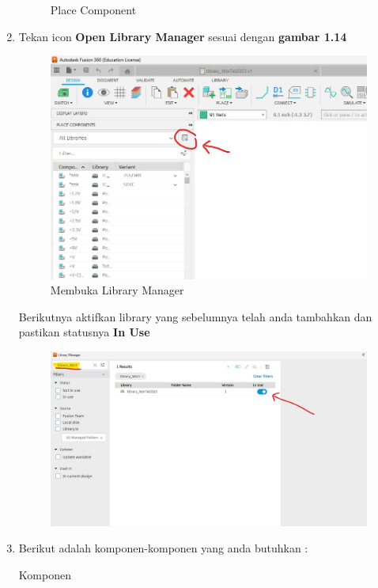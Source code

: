 \begin{enumerate}
\begin{figure}[H]
            \caption{Place Component} 
            \label{fig:Place Component}
        \end{figure}
    \item Tekan icon \textbf{Open Library Manager} sesuai dengan \textbf{gambar 1.14}
        \begin{figure}[H]
            \centering
            \includegraphics[width=0.6\linewidth]{P2/img/gambar14.jpeg}
            \caption{Membuka Library Manager} 
            \label{fig:Membuka LIbrary Manager}
        \end{figure}
    Berikutnya aktifkan library yang sebelumnya telah anda tambahkan dan pastikan statusnya \textbf{In Use}
        \begin{figure}[H]
            \centering
            \includegraphics[width=0.6\linewidth]{P2/img/gambar15.jpeg}
            
            
            \label{fig:Status Library}
        \end{figure}

    \newpage
    \item Berikut adalah komponen-komponen yang anda butuhkan :
    \vspace{5pt}
    \begin{table}[ht]
        
   
    \begin{center}
    
        \caption{Komponen}
        \label{tab:komponen}


\end{center}
\end{table}
\end{enumerate}
